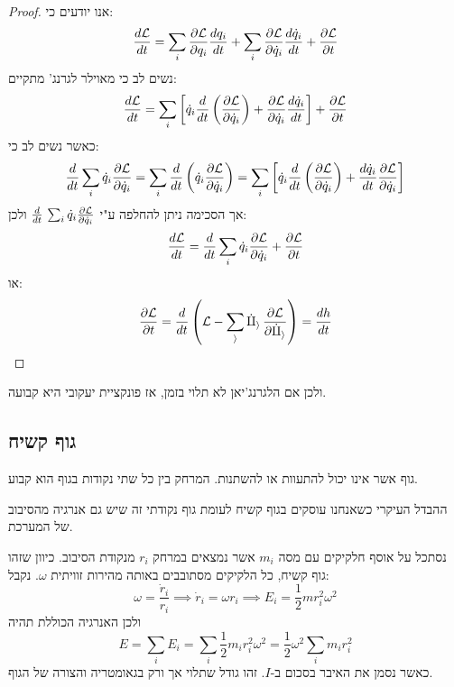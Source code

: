 \documentclass{tstextbook}
\begin{document}
\begin{proof}
אנו יודעים כי:
$${\frac{d \mathcal{L}}{d t}}=\sum_{i}{\frac{\partial \cal L}{\partial q_{i}}}{\frac{d q_{i}}{d t}}+\sum_{i}{\frac{\partial \cal L}{\partial{\dot{q}}_{i}}}{\frac{d{\dot{q}}_{i}}{d t}}+{\frac{\partial \cal L}{\partial t}}$$
נשים לב כי מאוילר לגרנג' מתקיים:
$${\frac{d \cal L}{d t}}=\sum_{i}\left[{\dot{q}}_{i}{\frac{d}{d t}}\left({\frac{\partial \cal L}{\partial{\dot{q}}_{i}}}\right)+{\frac{\partial \cal L}{\partial{\dot{q}}_{i}}}{\frac{d{\dot{q}}_{i}}{d t}}\right]+{\frac{\partial \cal L}{\partial t}}$$
כאשר נשים לב כי:
$${\frac{d}{d t}}\sum_{i}{\dot{q}}_{i}{\frac{\partial \cal L}{\partial{\dot{q}}_{i}}}=\sum_{i}{\frac{d}{d t}}\left({\dot{q}}_{i}{\frac{\partial \cal L}{\partial{\dot{q}}_{i}}}\right)=\sum_{i}\left[{\dot{q}}_{i}{\frac{d}{d t}}\left({\frac{\partial \cal L}{\partial{\dot{q}}_{i}}}\right)+{\frac{d{\dot{q}}_{i}}{d t}}{\frac{\partial \cal L}{\partial{\dot{q}}_{i}}}\right]$$
אך הסכימה ניתן להחלפה ע"י \(\frac{d}{d t}\,\sum_{i}\dot{q}_{i}\frac{\partial \cal L}{\partial\dot{q}_{i}}\) ולכן:
$${\frac{d \cal L}{d t}}={\frac{d}{d t}}\sum_{i}{\dot{q}}_{i}{\frac{\partial \cal L}{\partial{\dot{q}}_{i}}}+{\frac{\partial \cal L}{\partial t}}$$
או:
$${\frac{\partial \cal L}{\partial t}}={\frac{d}{d t}}\left(\cal L-\sum_{i}{\dot{q}}_{i}\,{\frac{\partial \cal L}{\partial{\dot{q}}_{i}}}\right)=\frac{dh}{dt}$$

\end{proof}
ולכן אם הלגרנג'יאן לא תלוי בזמן, אז פונקציית יעקובי היא קבועה.

\subsection{גוף קשיח}

\begin{definition}
גוף אשר אינו יכול להתעוות או להשתנות. המרחק בין כל שתי נקודות בגוף הוא קבוע.

\end{definition}
ההבדל העיקרי כשאנחנו עוסקים בגוף קשיח לעומת גוף נקודתי זה שיש גם אנרגיה מהסיבוב של המערכת.

נסתכל על אוסף חלקיקים עם מסה \(m_{i}\) אשר נמצאים במרחק \(r_{i}\) מנקודת הסיבוב. כיוון שזהו גוף קשיח, כל הלקיקים מסתובבים באותה מהירות זוויתית \(\omega\). נקבל:
$$\omega=\frac{\dot{r}_{i}}{r_{i}}\implies \dot{r}_{i}=\omega r_{i}\implies E_{i}=\frac{1}{2}mr_{i}^2\omega^2$$
ולכן האנרגיה הכוללת תהיה
$$E=\sum_{i}E_{i}=\sum_{i} \frac{1}{2}m_{i}r_{i}^2\omega^2=\frac{1}{2}\omega^2 \sum_{i}m_{i}r_{i}^2 $$
כאשר נסמן את האיבר בסכום ב-\(I\).  זהו גודל שתלוי אך ורק בגאומטריה והצורה של הגוף.
\end{document}
